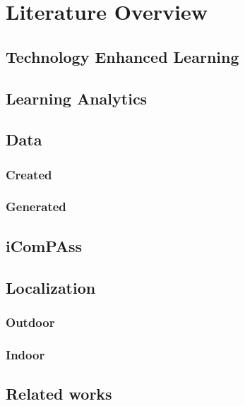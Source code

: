 \documentclass[../Main/thesis.tex]{subfiles}
\begin{document}
\chapter{Literature Overview}
\label{ch:literature_overview}

\section{Technology Enhanced Learning}


\section{Learning Analytics} 


\section{Data}

\subsection{Created}

\subsection{Generated}


\section{iComPAss}


\section{Localization}

\subsection{Outdoor}

\subsection{Indoor}

\section{Related works}
\end{document}
